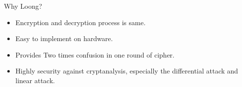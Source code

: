 \begin{frame}{Why Loong?}
    \begin{itemize}
        \item Encryption and decryption process is same.
        \pause
        \item Easy to implement on hardware.
        \pause
        \item Provides Two times confusion in one round of cipher.
        \pause
        \item Highly security against cryptanalysis, especially the
differential attack and linear attack.
    \end{itemize}
\end{frame}
